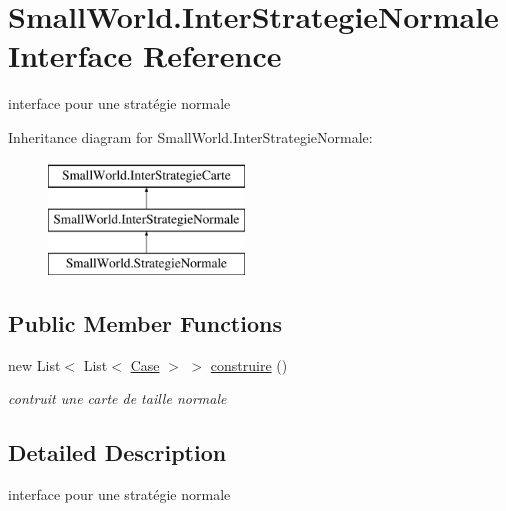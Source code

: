 \hypertarget{interface_small_world_1_1_inter_strategie_normale}{\section{Small\-World.\-Inter\-Strategie\-Normale Interface Reference}
\label{interface_small_world_1_1_inter_strategie_normale}
}


interface pour une stratégie normale  


Inheritance diagram for Small\-World.\-Inter\-Strategie\-Normale\-:\begin{figure}[H]
\begin{center}
\leavevmode
\includegraphics[height=3.000000cm]{interface_small_world_1_1_inter_strategie_normale}
\end{center}
\end{figure}
\subsection*{Public Member Functions}
\begin{DoxyCompactItemize}
\item 
new List$<$ List$<$ \hyperlink{class_small_world_1_1_case}{Case} $>$ $>$ \hyperlink{interface_small_world_1_1_inter_strategie_normale_a98ef2eb599e496422b6ce0e2c1dabad9}{construire} ()
\begin{DoxyCompactList}\small\item\em contruit une carte de taille normale \end{DoxyCompactList}\end{DoxyCompactItemize}


\subsection{Detailed Description}
interface pour une stratégie normale 

